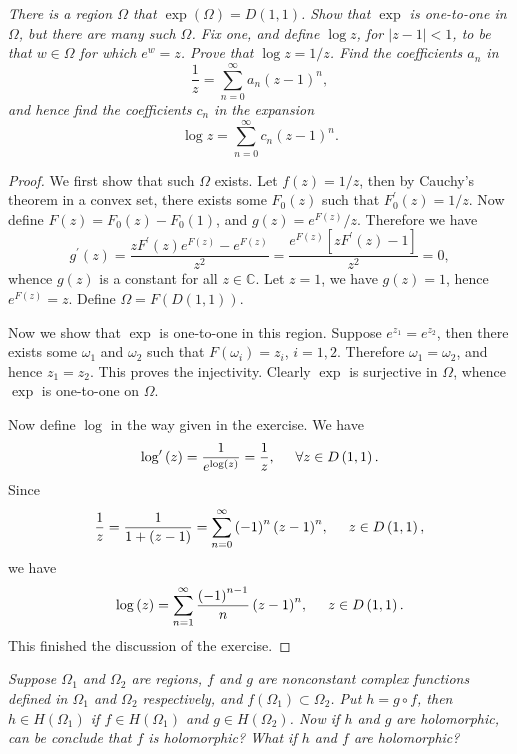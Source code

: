\begin{problem}\em
There is a region $\Omega$ that $\exp(\Omega)=D(1,1)$. Show that $\exp$ is one-to-one in $\Omega$, but there are many such $\Omega$. Fix one, and define $\log z$, for $|z-1|<1$, to be that $w\in\Omega$ for which $e^w=z$. Prove that $\log z=1/z$. Find the coefficients $a_n$ in 
$$\frac{1}{z}=\sum_{n=0}^\infty a_n(z-1)^n,$$
and hence find the coefficients $c_n$ in the expansion 
$$\log z=\sum_{n=0}^\infty c_n(z-1)^n.$$
\end{problem}
\begin{proof}
We first show that such $\Omega$ exists. Let $f(z)=1/z$, then by Cauchy's theorem in a convex set, there exists some $F_0(z)$ such that $F^\prime_0(z)=1/z$. Now define $F(z)=F_0(z)-F_0(1)$, and $g(z)=e^{F(z)}/z$. Therefore we have 
$$
g^{\prime}\left( z \right) =\frac{zF^{\prime}\left( z \right) e^{F\left( z \right)}-e^{F\left( z \right)}}{z^2}=\frac{e^{F\left( z \right)}\left[ zF^{\prime}\left( z \right) -1 \right]}{z^2}=0,
$$
whence $g(z)$ is a constant for all $z\in\mathbb{C}$. Let $z=1$, we have $g(z)=1$, hence $e^{F(z)}=z$. Define $\Omega=F(D(1,1))$.\par
Now we show that $\exp$ is one-to-one in this region. Suppose $e^{z_1}=e^{z_2}$, then there exists some $\omega_1$ and $\omega_2$ such that $F(\omega_i)=z_i$, $i=1,2$. Therefore $\omega_1=\omega_2$, and hence $z_1=z_2$. This proves the injectivity. Clearly $\exp$ is surjective in $\Omega$, whence $\exp$ is one-to-one on $\Omega$.\par
Now define $\log$ in the way given in the exercise. We have 
$$
\log ^{\prime}\left( z \right) =\frac{1}{e^{\log \left( z \right)}}=\frac{1}{z},\hspace{0.5cm}\forall z\in D\left( 1,1 \right) .
$$
Since 
$$
\frac{1}{z}=\frac{1}{1+\left( z-1 \right)}=\sum_{n=0}^{\infty}{\left( -1 \right) ^n\left( z-1 \right) ^n},\hspace{0.5cm}z\in D\left( 1,1 \right) ,
$$
we have 
$$
\log \left( z \right) =\sum_{n=1}^{\infty}{\frac{\left( -1 \right) ^{n-1}}{n}\left( z-1 \right) ^n},\hspace{0.5cm}z\in D\left( 1,1 \right) .
$$
This finished the discussion of the exercise.
\end{proof}
\begin{problem}\em
Suppose $\Omega_1$ and $\Omega_2$ are regions, $f$ and $g$ are nonconstant complex functions defined in $\Omega_1$ and $\Omega_2$ respectively, and $f(\Omega_1)\subset\Omega_2$. Put $h=g\circ f$, then $h\in H(\Omega_1)$ if $f\in H(\Omega_1)$ and $g\in H(\Omega_2)$. Now if $h$ and $g$ are holomorphic, can be conclude that $f$ is holomorphic? What if $h$ and $f$ are holomorphic?
\end{problem}
